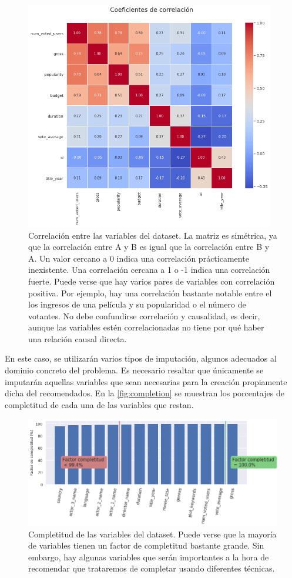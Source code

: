 \begin{figure}[H]
    \centering
    \captionsetup{width=12cm}
    \includegraphics[height=10cm]{./contenido/imagenes/correlation.png}
\caption{Correlación entre las variables del dataset. La matriz es simétrica, ya que la correlación entre A y B es igual que la correlación entre B y A. Un valor cercano a 0 indica una correlación prácticamente inexistente. Una correlación cercana a 1 o -1 indica una correlación fuerte. Puede verse que hay varios pares de variables con correlación positiva. Por ejemplo, hay una correlación bastante notable entre el los ingresos de una película y su popularidad o el número de votantes. No debe confundirse correlación y causalidad, es decir, aunque las variables estén correlacionadas no tiene por qué haber una relación causal directa.}
\label{fig:correlation}
\end{figure}

En este caso, se utilizarán varios tipos de imputación, algunos adecuados al dominio concreto del problema. Es necesario resaltar que únicamente se imputarán aquellas variables que sean necesarias para la creación propiamente dicha del recomendados. En la \autoref{fig:completion} se muestran los porcentajes de completitud de cada una de las variables que restan.

\begin{figure}[H]
    \centering
    \captionsetup{width=12cm}
    \includegraphics[width= 13cm]{./contenido/imagenes/completion.png}
\caption{Completitud de las variables del dataset. Puede verse que la mayoría de variables tienen un factor de completitud bastante grande. Sin embargo, hay algunas variables que serán importantes a la hora de recomendar que trataremos de completar usando diferentes técnicas.}
\label{fig:completion}
\end{figure}


